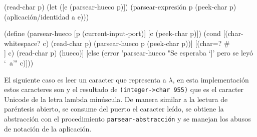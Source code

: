 \nwenddocs{}\endmoddef
(read-char p)
(let ([e (parsear-hueco p)])
  (parsear-expresión p (peek-char p) (aplicación/identidad a e)))
\nwendcode{}\nwdocspar

\nwenddocs{}\plusendmoddef
(define (parsear-hueco [p (current-input-port)]
                       [c (peek-char p)])
  (cond [(char-whitespace? c)
         (read-char p)
         (parsear-hueco p (peek-char p))]
        [(char=? #\\] c)
         (read-char p)
         (hueco)]
        [else
         (error 'parsear-hueco
                "Se esperaba `]' pero se leyó `~a'" c)]))

\eatline
{}\nwendcode{}\nwdocspar


El siguiente caso es leer un caracter que representa a \( λ \), en esta implementación estos caracteres son {\tt{}{}{}{}} y el resultado de {\tt{}(integer->char\ 955)} que es el caracter Unicode de la letra lambda minúscula. De manera similar a la lectura de paréntesis abierto, se consume del puerto el caracter leído, se obtiene la abstracción con el procedimiento {\tt{}parsear-\protect{}abstracción\protect{}} y se manejan los abusos de notación de la aplicación.

